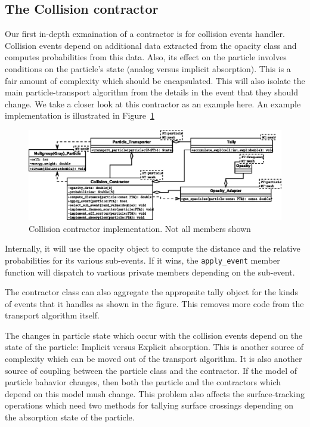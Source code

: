 \documentclass[memo]{ResearchNote}
\begin{document}
\subsection{The Collision contractor}

Our first in-depth exmaination of a contractor is for collision events
handler.  Collision events depend on additional data extracted from
the opacity class and computes probabilities from this data.  Also,
its effect on the particle involves conditions on the particle's state
(analog versus implicit absorption). This is a fair amount of
complexity which should be encapsulated. This will also isolate the
main particle-transport algorithm from the details in the event that
they should change. We take a closer look at this contractor as an
example here. An example implementation is illustrated in
Figure~\ref{fig:collision_contractor}

\begin{center}
  \begin{figure}
    \includegraphics[width=6.5in]{figures/collision_contractor}
    \caption{Collision contractor implementation. Not all members shown} 
    \label{fig:collision_contractor}
  \end{figure}
\end{center}

Internally, it will use the opacity object to compute the distance and
the relative probabilities for its various sub-events.  If it wins,
the {\tt apply\_event} member function will dispatch to vartious
private members depending on the sub-event.

The contractor class can also aggregate the appropaite tally object
for the kinds of events that it handles as shown in the figure. This
removes more code from the transport algorithm itself.

The changes in particle state which occur with the collision events
depend on the state of the particle: Implicit versus Explicit
absorption. This is another source of complexity which can be moved
out of the transport algorithm. It is also another source of coupling
between the particle class and the contractor. If the model of
particle bahavior changes, then both the particle and the contractors
which depend on this model mush change. This problem also affects the
surface-tracking operations which need two methods for tallying
surface crossings depending on the absorption state of the particle. 
\end{document}
